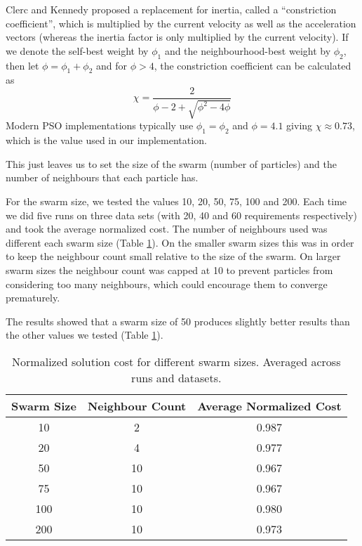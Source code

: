 \documentclass{sig-alternate}
\begin{document}
Clerc and Kennedy proposed a replacement for inertia, called a ``constriction coefficient''\cite{Clerc2002}, which is multiplied by the current velocity as well as the acceleration vectors (whereas the inertia factor is only multiplied by the current velocity). If we denote the self-best weight by $\phi_1$ and the neighbourhood-best weight by $\phi_2$, then let $\phi = \phi_1 + \phi_2$ and for $\phi > 4$, the constriction coefficient can be calculated as
$$\chi = \frac{2}{\phi - 2 + \sqrt{\phi^2 - 4\phi}}$$
Modern PSO implementations typically use $\phi_1 = \phi_2$ and $\phi = 4.1$ giving $\chi \approx 0.73$\cite{Bratton2007}, which is the value used in our implementation.

This just leaves us to set the size of the swarm (number of particles) and the number of neighbours that each particle has.

For the swarm size, we tested the values 10, 20, 50, 75, 100 and 200. Each time we did five runs on three data sets (with 20, 40 and 60 requirements respectively) and took the average normalized cost. The number of neighbours used was different each swarm size (Table \ref{table:psoswarmsizetests}). On the smaller swarm sizes this was in order to keep the neighbour count small relative to the size of the swarm. On larger swarm sizes the neighbour count was capped at 10 to prevent particles from considering too many neighbours, which could encourage them to converge prematurely. 

The results showed that a swarm size of 50 produces slightly better results than the other values we tested (Table \ref{table:psoswarmsizetests}).
\begin{table}
	\centering
	\begin{tabular}{ | c | c | c | }
		\hline
		Swarm Size & Neighbour Count & Average Normalized Cost \\ \hline
		10  & 2 & 0.987  \\ \hline
		20  & 4 & 0.977 \\ \hline
		50  & 10& 0.967 \\ \hline
		75  & 10& 0.967 \\ \hline
		100 & 10& 0.980 \\ \hline
		200 & 10& 0.973 \\ \hline
	\end{tabular}
	\caption{Normalized solution cost for different swarm sizes. Averaged across runs and datasets.}
	\label{table:psoswarmsizetests}
\end{table}
\end{document}
